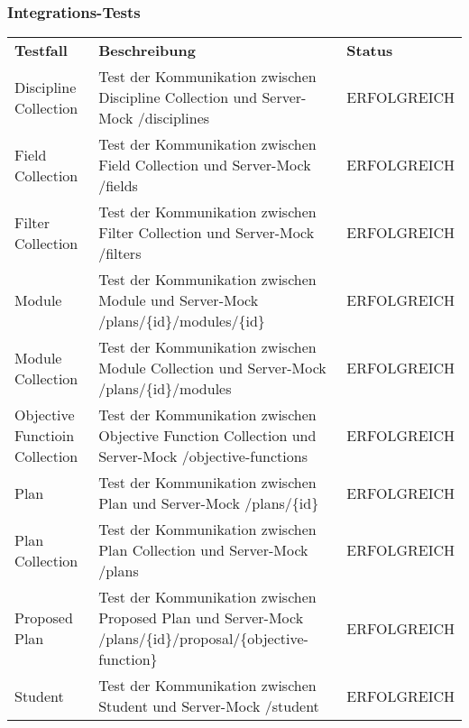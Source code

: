 \subsubsection*{Integrations-Tests}
\begin{longtable}{| >{\hspace{0pt}} p{} | >{\hspace{0pt}} p{} | >{\hspace{0pt}} p{} |}
	\hline
	\textbf{Testfall} & \textbf{Beschreibung} & \textbf{Status} \\ 
	\hhline{|=|=|=|}  
	\endfirsthead
	\endhead
	
	Discipline Collection & Test der Kommunikation zwischen Discipline Collection und Server-Mock /disciplines & ERFOLGREICH \\ \hline
	Field Collection & Test der Kommunikation zwischen Field Collection und Server-Mock /fields & ERFOLGREICH \\ \hline
	Filter Collection & Test der Kommunikation zwischen Filter Collection und Server-Mock /filters & ERFOLGREICH \\ \hline
	Module & Test der Kommunikation zwischen Module und Server-Mock /plans/\{id\}/modules/\{id\} & ERFOLGREICH \\ \hline
	Module Collection & Test der Kommunikation zwischen Module Collection und Server-Mock /plans/\{id\}/modules & ERFOLGREICH \\ \hline
	Objective Functioin Collection & Test der Kommunikation zwischen Objective Function Collection und Server-Mock /objective-functions  & ERFOLGREICH \\ \hline
	Plan & Test der Kommunikation zwischen Plan und Server-Mock /plans/\{id\} & ERFOLGREICH \\ \hline
	Plan Collection & Test der Kommunikation zwischen Plan Collection und Server-Mock /plans & ERFOLGREICH \\ \hline
	Proposed Plan & Test der Kommunikation zwischen Proposed Plan und Server-Mock /plans/\{id\}/proposal/\{objective-function\} & ERFOLGREICH \\ \hline
	Student & Test der Kommunikation zwischen Student und Server-Mock /student & ERFOLGREICH \\ \hline
	
\end{longtable}